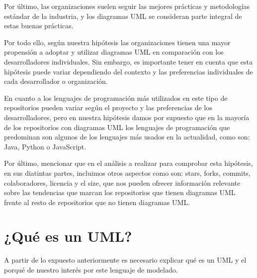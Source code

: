 \documentclass[a4paper, 12pt]{book}
\begin{document}
Por último, las organizaciones suelen seguir las mejores prácticas y metodologías estándar de la industria, y los diagramas UML se consideran parte integral de estas buenas prácticas. 


Por todo ello, según nuestra hipótesis las organizaciones tienen una mayor propensión a adoptar y utilizar diagramas UML en comparación con los desarrolladores individuales. 
Sin embargo, es importante tener en cuenta que esta hipótesis puede variar dependiendo del contexto y las preferencias individuales de cada desarrollador o organización.


En cuanto a los lenguajes de programación más utilizados en este tipo de repositorios pueden variar según el proyecto y las preferencias de los desarrolladores, pero en nuestra hipótesis damos por supuesto que en la mayoría de los repositorios con diagramas UML los lenguajes de programación que predominan son algunos de los lenguajes más usados en la actualidad, como son: Java, Python o JavaScript. 


Por último, mencionar que en el análisis a realizar para comprobar esta hipótesis, en sus diatintas partes, incluimos otros aspectos como son: stars, forks, commits, colaboradores, licencia y el size, que nos pueden ofrecer información relevante sobre las tendencias que marcan los repositorios que tienen diagramas UML frente al resto de repositorios que no tienen diagramas UML.




\section{¿Qué es un UML?} %
\label{sec:qué es un UML} %

A partir de lo expuesto anteriormente es necesario explicar qué es un UML y el porqué de nuestro interés por este lenguaje de modelado.
\end{document}
